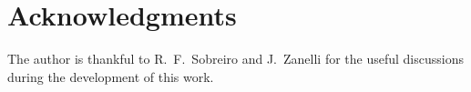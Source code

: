 \documentclass[../../main.tex]{subfiles}
\begin{document}
\section*{Acknowledgments}

The author is thankful to R.~F.~Sobreiro and J.~Zanelli for the useful discussions during the development of this work.
\end{document}
